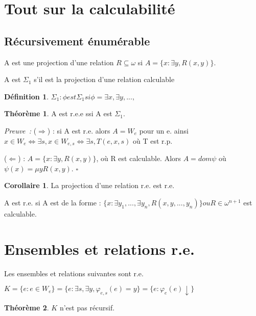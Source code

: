 \documentclass{book}
\theoremstyle{definition}
\newtheorem{theorem}{Théorème}
\newtheorem{definition}{Définition}
\newtheorem{corollary}{Corollaire}
\numberwithin{lemma}{subsection}
\numberwithin{theorem}{subsection}
\numberwithin{definition}{subsection}
\numberwithin{proposition}{subsection}
\numberwithin{corollary}{subsection}
\numberwithin{property}{subsection}
\numberwithin{example}{subsection}
\numberwithin{heuristique}{subsection}
\numberwithin{scenario}{subsection}
\newenvironment{proofi} {\noindent\emph{Preuve~:}} {\hfill $\square$\vspace{0.2cm}}
\begin{document}
\section{Tout sur la calculabilité}
    \subsection{Récursivement énumérable}
    
\par A est une projection d'une relation $R \subseteq \omega$ si $A=\{x:\exists y, R(x,y)\}$.
\par A est $\Sigma_1$ s'il est la projection d'une relation calculable
\begin{definition}
$\Sigma_1 : \phi est \Sigma_1 si \phi = \exists x, \exists y, ..., $
\end{definition}
\begin{theorem}
A est r.e.e ssi A est $\Sigma_1$.
\end{theorem}

\begin{proofi}
($\Rightarrow$) : si A est r.e. alors $A = W_e$ pour un e. ainsi $x \in W_e \Leftrightarrow \exists s, x \in W_{e,s} \Leftrightarrow \exists s, T(e,x,s)$ où T est r.p.
\par ($\Leftarrow$) : $A=\{x:\exists y, R(x,y)\}$, où R est calculable. Alors $A = dom \psi$ où $\psi(x) = \mu y R(x,y)$.
\end{proofi}

\begin{corollary}
La projection d'une relation r.e. est r.e.
\end{corollary}

\par A est r.e. si A est de la forme : $\{x : \exists y_1, ..., \exists y_n, R(x,y,...,y_n)\} ou R \in \omega^{n+1}$ est calculable.

\section{Ensembles et relations r.e.}

\par Les ensembles et relations suivantes sont r.e.
\par $K = \{e:e\in W_e\} = \{e:\exists s, \exists y, \varphi_{e,s}(e) = y\} = \{e : \varphi_e(e) \downarrow \}$

\begin{theorem}
$K$ n'est pas récursif.
\end{theorem}
\end{document}
